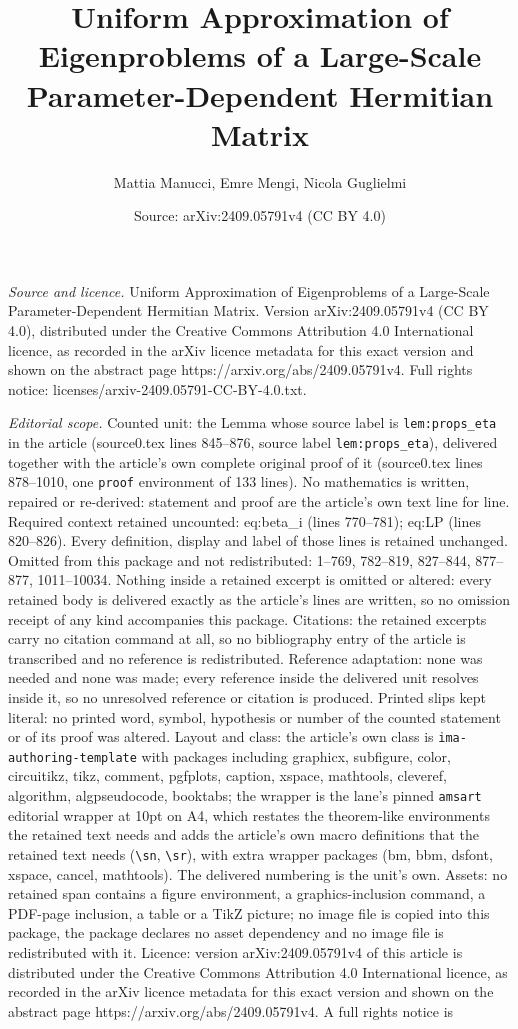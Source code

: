 \documentclass[10pt,a4paper]{amsart}
\title[Uniform Approximation of Eigenproblems of a Large-Scale Para]{Uniform Approximation of Eigenproblems of a Large-Scale Parameter-Dependent Hermitian Matrix}
\author{Mattia Manucci, Emre Mengi, Nicola Guglielmi}
\date{Source: arXiv:2409.05791v4 (CC BY 4.0)}
\begin{document}
\maketitle

\noindent\emph{Source and licence.} Uniform Approximation of Eigenproblems of a Large-Scale Parameter-Dependent Hermitian Matrix. Version arXiv:2409.05791v4 (CC BY 4.0), distributed under the Creative Commons Attribution 4.0 International licence, as recorded in the arXiv licence metadata for this exact version and shown on the abstract page https://arxiv.org/abs/2409.05791v4. Full rights notice: licenses/arxiv-2409.05791-CC-BY-4.0.txt.\par\smallskip

\noindent\textit{Editorial scope.} Counted unit: the Lemma whose source label is \texttt{lem:props\_eta} in the article (source0.tex lines 845--876, source label \texttt{lem:props\_eta}), delivered together with the article's own complete original proof of it (source0.tex lines 878--1010, one \texttt{proof} environment of 133 lines). No mathematics is written, repaired or re-derived: statement and proof are the article's own text line for line. Required context retained uncounted: eq:beta\_i (lines 770--781); eq:LP (lines 820--826). Every definition, display and label of those lines is retained unchanged. Omitted from this package and not redistributed: 1--769, 782--819, 827--844, 877--877, 1011--10034. Nothing inside a retained excerpt is omitted or altered: every retained body is delivered exactly as the article's lines are written, so no omission receipt of any kind accompanies this package. Citations: the retained excerpts carry no citation command at all, so no bibliography entry of the article is transcribed and no reference is redistributed. Reference adaptation: none was needed and none was made; every reference inside the delivered unit resolves inside it, so no unresolved reference or citation is produced. Printed slips kept literal: no printed word, symbol, hypothesis or number of the counted statement or of its proof was altered. Layout and class: the article's own class is \texttt{ima-authoring-template} with packages including graphicx, subfigure, color, circuitikz, tikz, comment, pgfplots, caption, xspace, mathtools, cleveref, algorithm, algpseudocode, booktabs; the wrapper is the lane's pinned \texttt{amsart} editorial wrapper at 10pt on A4, which restates the theorem-like environments the retained text needs and adds the article's own macro definitions that the retained text needs (\texttt{\textbackslash sn}, \texttt{\textbackslash sr}), with extra wrapper packages (bm, bbm, dsfont, xspace, cancel, mathtools). The delivered numbering is the unit's own. Assets: no retained span contains a figure environment, a graphics-inclusion command, a PDF-page inclusion, a table or a TikZ picture; no image file is copied into this package, the package declares no asset dependency and no image file is redistributed with it. Licence: version arXiv:2409.05791v4 of this article is distributed under the Creative Commons Attribution 4.0 International licence, as recorded in the arXiv licence metadata for this exact version and shown on the abstract page https://arxiv.org/abs/2409.05791v4. A full rights notice is 
\end{document}
